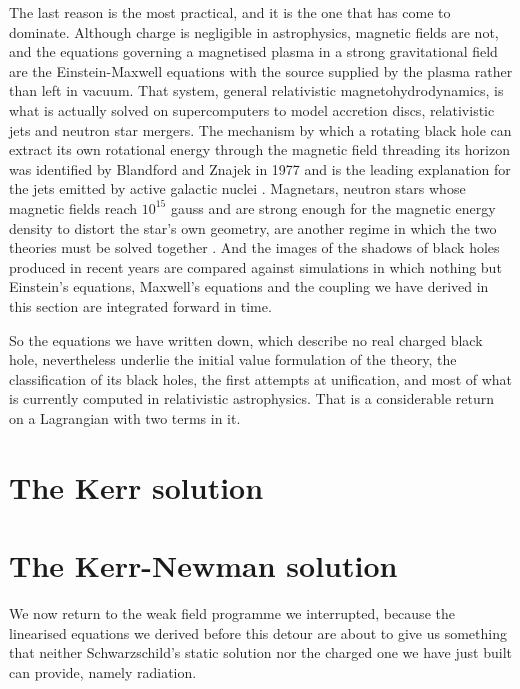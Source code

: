         The last reason is the most practical, and it is the one that has come to dominate. Although charge is negligible in astrophysics, magnetic fields are not, and the equations governing a magnetised plasma in a strong gravitational field are the Einstein-Maxwell equations with the source supplied by the plasma rather than left in vacuum. That system, general relativistic magnetohydrodynamics, is what is actually solved on supercomputers to model accretion discs, relativistic jets and neutron star mergers. The mechanism by which a rotating black hole can extract its own rotational energy through the magnetic field threading its horizon was identified by Blandford and Znajek in 1977 and is the leading explanation for the jets emitted by active galactic nuclei \citep{blandford1977}. Magnetars, neutron stars whose magnetic fields reach $10^{15}$ gauss and are strong enough for the magnetic energy density to distort the star's own geometry, are another regime in which the two theories must be solved together \citep{duncan1992}. And the images of the shadows of black holes produced in recent years are compared against simulations in which nothing but Einstein's equations, Maxwell's equations and the coupling we have derived in this section are integrated forward in time.

        So the equations we have written down, which describe no real charged black hole, nevertheless underlie the initial value formulation of the theory, the classification of its black holes, the first attempts at unification, and most of what is currently computed in relativistic astrophysics. That is a considerable return on a Lagrangian with two terms in it.

    \section{The Kerr solution}

    \section{The Kerr-Newman solution}

    We now return to the weak field programme we interrupted, because the linearised equations we derived before this detour are about to give us something that neither Schwarzschild's static solution nor the charged one we have just built can provide, namely radiation.
